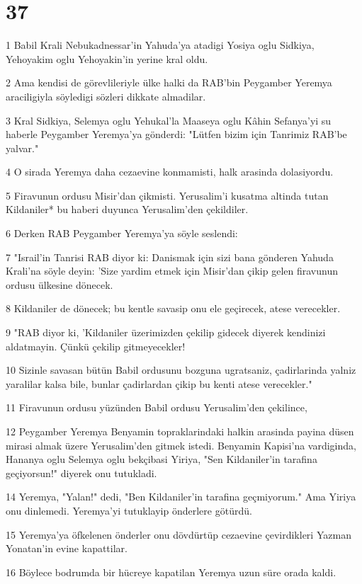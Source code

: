 \chapter{37}

\par 1 Babil Krali Nebukadnessar'in Yahuda'ya atadigi Yosiya oglu Sidkiya, Yehoyakim oglu Yehoyakin'in yerine kral oldu.
\par 2 Ama kendisi de görevlileriyle ülke halki da RAB'bin Peygamber Yeremya araciligiyla söyledigi sözleri dikkate almadilar.
\par 3 Kral Sidkiya, Selemya oglu Yehukal'la Maaseya oglu Kâhin Sefanya'yi su haberle Peygamber Yeremya'ya gönderdi: "Lütfen bizim için Tanrimiz RAB'be yalvar."
\par 4 O sirada Yeremya daha cezaevine konmamisti, halk arasinda dolasiyordu.
\par 5 Firavunun ordusu Misir'dan çikmisti. Yerusalim'i kusatma altinda tutan Kildaniler* bu haberi duyunca Yerusalim'den çekildiler.
\par 6 Derken RAB Peygamber Yeremya'ya söyle seslendi:
\par 7 "Israil'in Tanrisi RAB diyor ki: Danismak için sizi bana gönderen Yahuda Krali'na söyle deyin: 'Size yardim etmek için Misir'dan çikip gelen firavunun ordusu ülkesine dönecek.
\par 8 Kildaniler de dönecek; bu kentle savasip onu ele geçirecek, atese verecekler.
\par 9 "RAB diyor ki, 'Kildaniler üzerimizden çekilip gidecek diyerek kendinizi aldatmayin. Çünkü çekilip gitmeyecekler!
\par 10 Sizinle savasan bütün Babil ordusunu bozguna ugratsaniz, çadirlarinda yalniz yaralilar kalsa bile, bunlar çadirlardan çikip bu kenti atese verecekler."
\par 11 Firavunun ordusu yüzünden Babil ordusu Yerusalim'den çekilince,
\par 12 Peygamber Yeremya Benyamin topraklarindaki halkin arasinda payina düsen mirasi almak üzere Yerusalim'den gitmek istedi. Benyamin Kapisi'na vardiginda, Hananya oglu Selemya oglu bekçibasi Yiriya, "Sen Kildaniler'in tarafina geçiyorsun!" diyerek onu tutukladi.
\par 14 Yeremya, "Yalan!" dedi, "Ben Kildaniler'in tarafina geçmiyorum." Ama Yiriya onu dinlemedi. Yeremya'yi tutuklayip önderlere götürdü.
\par 15 Yeremya'ya öfkelenen önderler onu dövdürtüp cezaevine çevirdikleri Yazman Yonatan'in evine kapattilar.
\par 16 Böylece bodrumda bir hücreye kapatilan Yeremya uzun süre orada kaldi.
